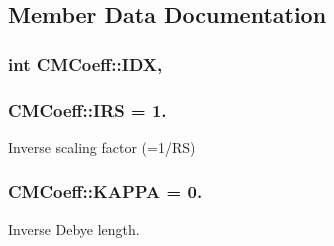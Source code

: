 \subsection{Member Data Documentation}
\hypertarget{classCMCoeff_ab1882e6a0df777b1acffadf55844dc92}{
\subsubsection[{I\-D\-X}]{\setlength{\rightskip}{0pt plus 5cm}int C\-M\-Coeff\-::\-I\-D\-X\hspace{0.3cm}{\ttfamily [static]}, {\ttfamily [protected]}}}\label{classCMCoeff_ab1882e6a0df777b1acffadf55844dc92}
\hypertarget{classCMCoeff_a7e893ff6deb29f85472663fffd995f42}{
\subsubsection[{I\-R\-S}]{ C\-M\-Coeff\-::\-I\-R\-S = 1.\hspace{0.3cm}{\ttfamily [static]}}}\label{classCMCoeff_a7e893ff6deb29f85472663fffd995f42}


Inverse scaling factor (=1/\-R\-S) 

\hypertarget{classCMCoeff_a468f6af1ba4ddbe13561217488c87b40}{
\subsubsection[{K\-A\-P\-P\-A}]{ C\-M\-Coeff\-::\-K\-A\-P\-P\-A = 0.\hspace{0.3cm}{\ttfamily [static]}}}\label{classCMCoeff_a468f6af1ba4ddbe13561217488c87b40}


Inverse Debye length. 

